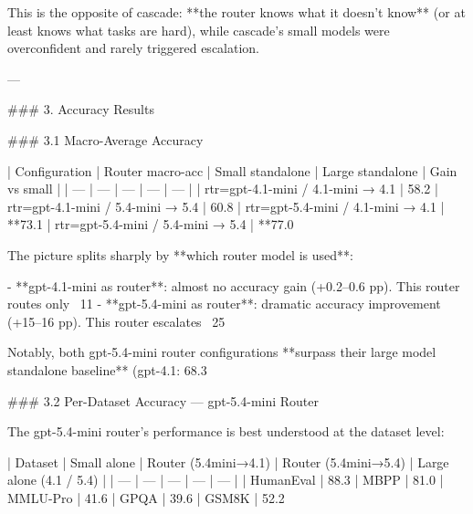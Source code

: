 This is the opposite of cascade: **the router knows what it doesn't know** (or at least knows what tasks are hard), while cascade's small models were overconfident and rarely triggered escalation.

---

### 3. Accuracy Results

### 3.1 Macro-Average Accuracy

| Configuration | Router macro-acc | Small standalone | Large standalone | Gain vs small |
| --- | --- | --- | --- | --- |
| rtr=gpt-4.1-mini / 4.1-mini → 4.1 | 58.2%
| rtr=gpt-4.1-mini / 5.4-mini → 5.4 | 60.8%
| rtr=gpt-5.4-mini / 4.1-mini → 4.1 | **73.1%
| rtr=gpt-5.4-mini / 5.4-mini → 5.4 | **77.0%

The picture splits sharply by **which router model is used**:

- **gpt-4.1-mini as router**: almost no accuracy gain (+0.2–0.6 pp). This router routes only ~11%
- **gpt-5.4-mini as router**: dramatic accuracy improvement (+15–16 pp). This router escalates ~25%

Notably, both gpt-5.4-mini router configurations **surpass their large model standalone baseline** (gpt-4.1: 68.3%

### 3.2 Per-Dataset Accuracy — gpt-5.4-mini Router

The gpt-5.4-mini router's performance is best understood at the dataset level:

| Dataset | Small alone | Router (5.4mini→4.1) | Router (5.4mini→5.4) | Large alone (4.1 / 5.4) |
| --- | --- | --- | --- | --- |
| HumanEval | 88.3%
| MBPP | 81.0%
| MMLU-Pro | 41.6%
| GPQA | 39.6%
| GSM8K | 52.2%

